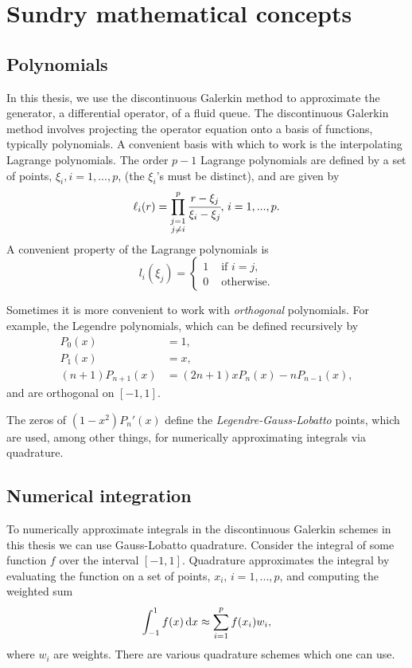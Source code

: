 \section{Sundry mathematical concepts}\label{eqn: la}
\subsection*{Polynomials}
In this thesis, we use the discontinuous Galerkin method to approximate the generator, a differential operator, of a fluid queue. The discontinuous Galerkin method involves projecting the operator equation onto a basis of functions, typically polynomials. A convenient basis with which to work is the interpolating Lagrange polynomials. The order \(p-1\) Lagrange polynomials are defined by a set of points, \(\xi_i, i=1,...,p\), (the \(\xi_i\)'s must be distinct), and are given by 
\[\ell_i(r)=\prod_{\substack{j=1\\j\neq i}}^p \cfrac{r-\xi_j}{\xi_i-\xi_j},\, i=1,...,p.\]
A convenient property of the Lagrange polynomials is 
\[l_i(\xi_j)=\begin{cases}1 & \mbox{ if } i=j, \\ 0 & \mbox{ otherwise.} \end{cases}\]

Sometimes it is more convenient to work with \emph{orthogonal} polynomials. For example, the Legendre polynomials, which can be defined recursively by 
\begin{align*}
	P_0(x)&=1,
	\\P_1(x)&=x, 
	\\(n+1)P_{n+1}(x)&=(2n+1)xP_n(x)-nP_{n-1}(x),
\end{align*}
and are orthogonal on \([-1,1]\). 

The zeros of \((1-x^2)P_n'(x)\) define the \emph{Legendre-Gauss-Lobatto} points, which are used, among other things, for numerically approximating integrals via quadrature.

\subsection*{Numerical integration}
To numerically approximate integrals in the discontinuous Galerkin schemes in this thesis we can use Gauss-Lobatto quadrature. Consider the integral of some function \(f\) over the interval \([-1,1]\). Quadrature approximates the integral by evaluating the function on a set of points, \(x_i,\, i=1,...,p\), and computing the weighted sum
\[\int_{-1}^1f(x)\, \mathrm{d} x \approx \sum_{i=1}^p f(x_i)w_i,\]
where \(w_i\) are weights. There are various quadrature schemes which one can use. 

